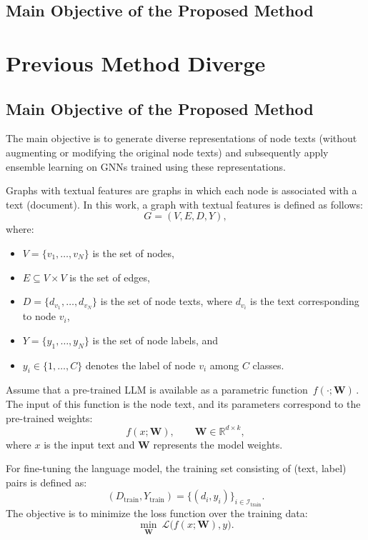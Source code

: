 \documentclass{article}
\begin{document}
\subsection{Main Objective of the Proposed Method}

\section{Previous Method Diverge}

\subsection{Main Objective of the Proposed Method}
The main objective is to generate diverse representations of node texts (without augmenting or modifying the original node texts) and subsequently apply ensemble learning on GNNs trained using these representations.

Graphs with textual features are graphs in which each node is associated with a text (document). In this work, a graph with textual features is defined as follows:
\begin{equation}
G = (V, E, D, Y),
\end{equation}
where:
\begin{itemize}
\item $V=\{v_1,\dots,v_N\}$ is the set of nodes,
\item $E \subseteq V\times V$ is the set of edges,
\item $D=\{d_{v_1},\dots,d_{v_N}\}$ is the set of node texts, where $d_{v_i}$ is the text corresponding to node $v_i$,
\item $Y=\{y_1,\dots,y_N\}$ is the set of node labels, and
\item $y_i \in \{1,\dots,C\}$ denotes the label of node $v_i$ among $C$ classes.
\end{itemize}

Assume that a pre-trained LLM is available as a parametric function $\,f(\cdot;\mathbf{W})\,$. The input of this function is the node text, and its parameters correspond to the pre-trained weights:
\begin{equation}
f(x;\mathbf{W}), \qquad \mathbf{W}\in\mathbb{R}^{d\times k},
\end{equation}
where $x$ is the input text and $\mathbf{W}$ represents the model weights.

For fine-tuning the language model, the training set consisting of (text, label) pairs is defined as:
\begin{equation}
(D_{\text{train}},Y_{\text{train}})=\{(d_i,y_i)\}_{i\in\mathcal{I}_{\text{train}}}.
\end{equation}
The objective is to minimize the loss function over the training data:
\begin{equation}
\min_{\mathbf{W}} \ \mathcal{L}\big(f(x;\mathbf{W}), y\big).
\end{equation}
\end{document}
